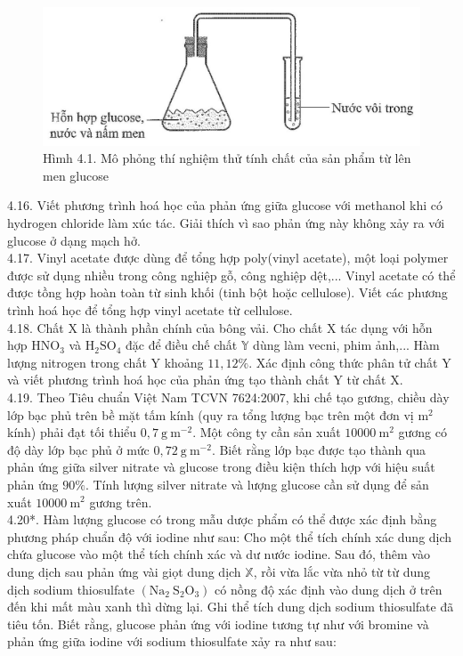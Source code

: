\documentclass[10pt]{article}
\begin{document}
\begin{figure}[h]
\begin{center}
  \includegraphics[width=\textwidth]{2025_10_23_80c1361fcdcd395cad8eg-13}
\captionsetup{labelformat=empty}
\caption{Hìmh 4.1. Mô phỏng thí nghiệm thử tính chất của sản phẩm từ lên men glucose}
\end{center}
\end{figure}

4.16. Viết phương trình hoá học của phản ứng giữa glucose với methanol khi có hydrogen chloride làm xúc tác. Giải thích vì sao phản ứng này không xảy ra với glucose ở dạng mạch hở.\\
4.17. Vinyl acetate được dùng để tổng hợp poly(vinyl acetate), một loại polymer được sử dụng nhiều trong công nghiệp gỗ, công nghiệp dệt,... Vinyl acetate có thể được tồng hợp hoàn toàn từ sinh khối (tinh bột hoặc cellulose). Viết các phương trình hoá học để tổng hợp vinyl acetate từ cellulose.\\
4.18. Chất X là thành phần chính của bông vải. Cho chất X tác dụng với hỗn hợp $\mathrm{HNO}_{3}$ và $\mathrm{H}_{2} \mathrm{SO}_{4}$ đặc để điều chế chất $\mathbb{Y}$ dùng làm vecni, phim ảnh,... Hàm lượng nitrogen trong chất Y khoảng $11,12 \%$. Xác định công thức phân tử chất Y và viết phương trình hoá học của phản ứng tạo thành chất Y từ chất X.\\
4.19. Theo Tiêu chuẩn Việt Nam TCVN 7624:2007, khi chế tạo gương, chiều dày lớp bạc phủ trên bề mặt tấm kính (quy ra tổng lượng bạc trên một đơn vị $\mathrm{m}^{2}$ kính) phải đạt tối thiểu $0,7 \mathrm{~g} \mathrm{~m}^{-2}$. Một công ty cần sản xuất $10000 \mathrm{~m}^{2}$ gương có độ dày lớp bạc phủ ở mức $0,72 \mathrm{~g} \mathrm{~m}^{-2}$. Biết rằng lớp bạc được tạo thành qua phản ứng giữa silver nitrate và glucose trong điều kiện thích hợp với hiệu suất phản ứng $90 \%$. Tính lượng silver nitrate và lượng glucose cần sử dụng để sản xuất $10000 \mathrm{~m}^{2}$ gương trên.\\
4.20*. Hàm lượng glucose có trong mẫu dược phẩm có thể được xác định bằng phương pháp chuẩn độ với iodine như sau: Cho một thể tích chính xác dung dịch chứa glucose vào một thể tích chính xác và dư nước iodine. Sau đó, thêm vào dung dịch sau phản ứng vài giọt dung dịch $\mathbb{X}$, rồi vừa lắc vừa nhỏ từ từ dung dịch sodium thiosulfate $\left(\mathrm{Na}_{2} \mathrm{~S}_{2} \mathrm{O}_{3}\right)$ có nồng độ xác định vào dung dịch ở trên đến khi mất màu xanh thì dừng lại. Ghi thể tích dung dịch sodium thiosulfate đã tiêu tốn. Biết rằng, glucose phản ứng với iodine tương tự như với bromine và phản ứng giữa iodine với sodium thiosulfate xảy ra như sau:
\end{document}
